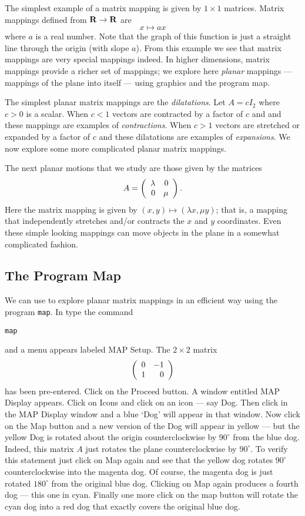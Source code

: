 The simplest example of a matrix mapping is given by $1\times 1$
matrices.  Matrix mappings defined from $\mbox{$\bf{R}$}\to\mbox{$\bf{R}$}$ are
\[
x \mapsto ax
\]
where $a$ is a real number.  Note that the graph of this
function is just a straight line through the origin (with slope
$a$).  From this example we see that matrix mappings are very
special mappings indeed. In higher dimensions, matrix mappings
provide a richer set of mappings; we explore here {\em planar\/}
mappings --- mappings of the plane into
itself --- using \Matlab graphics and the program {\sf map}.

The simplest planar matrix mappings are the
{\em dilatations\/}.
Let $A=cI_2$ where $c>0$ is a scalar.  When $c<1$ vectors are
contracted by a factor of $c$ and and these mappings are
examples of {\em contractions}.
When $c>1$ vectors are
stretched or expanded by a factor of $c$ and these dilatations
are examples of {\em expansions}.
We now explore some more complicated planar matrix mappings.

The next planar motions that we study are those given by the
matrices
\[
A=\left(\begin{array}{rr} \lambda & 0\\ 0 &\mu\end{array}\right).
\]
Here the matrix mapping is given by $(x,y)\mapsto(\lambda x,\mu y)$;
that is, a mapping that independently stretches and/or contracts the
$x$ and $y$ coordinates.  Even these simple looking mappings can move 
objects in the plane in a somewhat complicated fashion.

\subsection*{The Program Map}  

We can use \Matlab to explore planar matrix mappings in an efficient way 
using the program {\tt map}.  In \Matlab type the command
\begin{verbatim}
map
\end{verbatim}
and a menu appears labeled {\sf MAP Setup}.  The $2\times 2$ matrix
\[
\left(\begin{array}{rr} 0 & -1\\ 1 &0\end{array}\right)
\]
has been pre-entered.  Click on the {\sf Proceed} button.  A
window entitled {\sf MAP Display} appears. Click on {\sf Icons}
and click on an icon --- say {\sf Dog}. 
Then click in the {\sf MAP Display} window and a blue `{\sf Dog}' 
will appear in that window.  Now click on
the {\sf Map} button and a new version of the {\sf Dog} will
appear in yellow --- but the yellow {\sf Dog} is rotated about
the origin counterclockwise by $90^\circ$ from the blue dog.
Indeed, this matrix $A$ just rotates the plane counterclockwise
by $90^\circ$.  To verify this statement just click on {\sf Map}
again and see that the yellow dog rotates $90^\circ$
counterclockwise into the magenta dog.  Of course, the magenta
dog is just rotated $180^\circ$ from the original blue dog.
Clicking on {\sf Map} again produces a fourth dog --- this one
in cyan.  Finally one more click on the {\sf map} button will
rotate the cyan dog into a red dog that exactly covers the
original blue dog.


